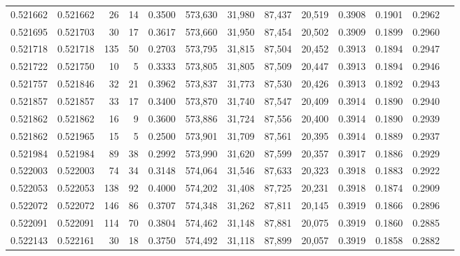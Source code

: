 \begin{tabular}{rrrrrrrrrrrrr}
0.521662 & 0.521662 &    26 &    14 &                                     0.3500 & 573,630 &  31,980 &  87,437 &  20,519 & 0.3908 & 0.1901 & 0.2962 \\
0.521695 & 0.521703 &    30 &    17 &                                     0.3617 & 573,660 &  31,950 &  87,454 &  20,502 & 0.3909 & 0.1899 & 0.2960 \\
0.521718 & 0.521718 &   135 &    50 &                                     0.2703 & 573,795 &  31,815 &  87,504 &  20,452 & 0.3913 & 0.1894 & 0.2947 \\
0.521722 & 0.521750 &    10 &     5 &                                     0.3333 & 573,805 &  31,805 &  87,509 &  20,447 & 0.3913 & 0.1894 & 0.2946 \\
0.521757 & 0.521846 &    32 &    21 &                                     0.3962 & 573,837 &  31,773 &  87,530 &  20,426 & 0.3913 & 0.1892 & 0.2943 \\
0.521857 & 0.521857 &    33 &    17 &                                     0.3400 & 573,870 &  31,740 &  87,547 &  20,409 & 0.3914 & 0.1890 & 0.2940 \\
0.521862 & 0.521862 &    16 &     9 &                                     0.3600 & 573,886 &  31,724 &  87,556 &  20,400 & 0.3914 & 0.1890 & 0.2939 \\
0.521862 & 0.521965 &    15 &     5 &                                     0.2500 & 573,901 &  31,709 &  87,561 &  20,395 & 0.3914 & 0.1889 & 0.2937 \\
0.521984 & 0.521984 &    89 &    38 &                                     0.2992 & 573,990 &  31,620 &  87,599 &  20,357 & 0.3917 & 0.1886 & 0.2929 \\
0.522003 & 0.522003 &    74 &    34 &                                     0.3148 & 574,064 &  31,546 &  87,633 &  20,323 & 0.3918 & 0.1883 & 0.2922 \\
0.522053 & 0.522053 &   138 &    92 &                                     0.4000 & 574,202 &  31,408 &  87,725 &  20,231 & 0.3918 & 0.1874 & 0.2909 \\
0.522072 & 0.522072 &   146 &    86 &                                     0.3707 & 574,348 &  31,262 &  87,811 &  20,145 & 0.3919 & 0.1866 & 0.2896 \\
0.522091 & 0.522091 &   114 &    70 &                                     0.3804 & 574,462 &  31,148 &  87,881 &  20,075 & 0.3919 & 0.1860 & 0.2885 \\
0.522143 & 0.522161 &    30 &    18 &                                     0.3750 & 574,492 &  31,118 &  87,899 &  20,057 & 0.3919 & 0.1858 & 0.2882 \\

\end{tabular}
